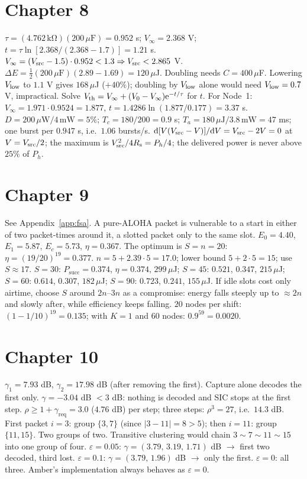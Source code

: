 \section*{Chapter 8}
 $\tau=(4.762\,\mathrm{k\Omega})(200\,\mu\mathrm F)=0.952$ s; $V_\infty=2.368$ V; $t=\tau\ln[2.368/(2.368-1.7)]=1.21$ s.
 $V_\infty=(V_{\mathrm{src}}-1.5)\cdot0.952<1.3\Rightarrow V_{\mathrm{src}}<2.865$ V.
 $\Delta E=\tfrac12(200\,\mu\mathrm F)(2.89-1.69)=120\,\mu$J. Doubling needs $C=400\,\mu$F. Lowering $V_{\mathrm{low}}$ to $1.1$ V gives $168\,\mu$J ($+40\%$); doubling by $V_{\mathrm{low}}$ alone would need $V_{\mathrm{low}}=0.7$ V, impractical.
 Solve $V_{\mathrm{th}}=V_\infty+(V_0-V_\infty)\mathrm{e}^{-t/\tau}$ for $t$. For Node~1: $V_\infty=1.971\cdot0.9524=1.877$, $t=1.4286\ln(1.877/0.177)=3.37$ s.
 $D=200\,\mu\mathrm W/4\,\mathrm{mW}=5\%$; $T_c=180/200=0.9$ s; $T_a=180\,\mu\mathrm J/3.8\,\mathrm{mW}=47$ ms; one burst per $0.947$ s, i.e.\ $1.06$ bursts/s.
 $\mathrm d[V(V_{\mathrm{src}}-V)]/\mathrm dV=V_{\mathrm{src}}-2V=0$ at $V=V_{\mathrm{src}}/2$; the maximum is $V_{\mathrm{src}}^2/4R_{\mathrm{s}}=P_h/4$; the delivered power is never above $25\%$ of $P_h$.

\section*{Chapter 9}
 See Appendix~\ref{app:fsa}. A pure-ALOHA packet is vulnerable to a start in either of two packet-times around it, a slotted packet only to the same slot.
 $E_0=4.40$, $E_1=5.87$, $E_c=5.73$, $\eta=0.367$. The optimum is $S=n=20$: $\eta=(19/20)^{19}=0.377$.
 $\hat n=5+2.39\cdot5=17.0$; lower bound $5+2\cdot5=15$; use $S\approx17$.
 $S=30$: $P_{\mathrm{succ}}=0.374$, $\eta=0.374$, $299\,\mu$J; $S=45$: $0.521$, $0.347$, $215\,\mu$J; $S=60$: $0.614$, $0.307$, $182\,\mu$J; $S=90$: $0.723$, $0.241$, $155\,\mu$J. If idle slots cost only airtime, choose $S$ around $2n$--$3n$ as a compromise: energy falls steeply up to $\approx2n$ and slowly after, while efficiency keeps falling.
 $20$ nodes per shift: $(1-1/10)^{19}=0.135$; with $K=1$ and $60$ nodes: $0.9^{59}=0.0020$.

\section*{Chapter 10}
 $\gamma_1=7.93$ dB, $\gamma_2=17.98$ dB (after removing the first). Capture alone decodes the first only.
 $\gamma=-3.04$ dB $<3$ dB: nothing is decoded and SIC stops at the first step.
 $\rho\ge1+\gamma_{\mathrm{req}}=3.0$ ($4.76$ dB) per step; three steps: $\rho^3=27$, i.e.\ $14.3$ dB.
 First packet $i=3$: group $\{3,7\}$ (since $|3-11|=8>5$); then $i=11$: group $\{11,15\}$. Two groups of two. Transitive clustering would chain $3\sim7\sim11\sim15$ into one group of four.
 $\varepsilon=0.05$: $\gamma=(3.79,\,3.19,\,1.71)$ dB $\to$ first two decoded, third lost. $\varepsilon=0.1$: $\gamma=(3.79,\,1.96)$ dB $\to$ only the first. $\varepsilon=0$: all three. Amber's implementation always behaves as $\varepsilon=0$.

